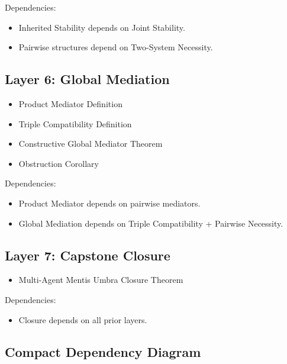 \documentclass[11pt]{article}
\theoremstyle{definition}
\begin{document}
Dependencies:
\begin{itemize}
    \item Inherited Stability depends on Joint Stability.
    \item Pairwise structures depend on Two-System Necessity.
\end{itemize}

\subsection*{Layer 6: Global Mediation}

\begin{itemize}
    \item Product Mediator Definition
    \item Triple Compatibility Definition
    \item Constructive Global Mediator Theorem
    \item Obstruction Corollary
\end{itemize}

Dependencies:
\begin{itemize}
    \item Product Mediator depends on pairwise mediators.
    \item Global Mediation depends on Triple Compatibility + Pairwise Necessity.
\end{itemize}

\subsection*{Layer 7: Capstone Closure}

\begin{itemize}
    \item Multi-Agent Mentis Umbra Closure Theorem
\end{itemize}

Dependencies:
\begin{itemize}
    \item Closure depends on all prior layers.
\end{itemize}


\subsection*{Compact Dependency Diagram}
\end{document}
